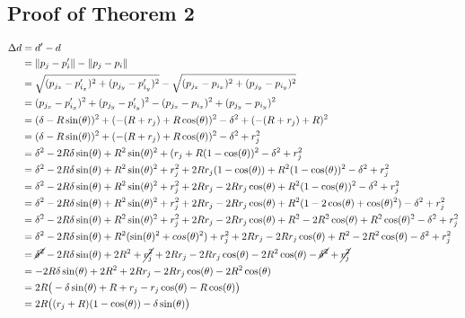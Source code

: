 \documentclass[conference]{IEEEtran}
\begin{document}
\subsection{Proof of Theorem 2} \label{thm:2}

    \begin{align*}
      \Delta d &= d' - d \\
      &= \lVert p_j - p'_i \rVert - \lVert p_j - p_i \rVert \\
      &=\sqrt{(p_{j_x} - p'_{i_x})^2 + (p_{j_y} - p'_{i_y})^2} - \sqrt{(p_{j_x} - p_{i_x})^2 + (p_{j_y} - p_{i_y})^2} \\
      &=(p_{j_x} - p'_{i_x})^2 + (p_{j_y} - p'_{i_y})^2 - (p_{j_x} - p_{i_x})^2 + (p_{j_y} - p_{i_y})^2 \\
      &= (\delta - R\sin(\theta))^2 + (-(R+r_j) + R\cos(\theta))^2 - \delta^2 + (-(R+r_j) + R)^2 \\
      &= (\delta - R\sin(\theta))^2 + (-(R+r_j) + R\cos(\theta))^2 - \delta^2 + r_j^2 \\
      &= \delta^2 - 2R\delta\sin(\theta) + R^2\sin(\theta)^2 + (r_j + R(1 - \cos(\theta))^2 - \delta^2 + r_j^2 \\
      &= \delta^2 - 2R\delta\sin(\theta) + R^2\sin(\theta)^2 + r_j^2 + 2Rr_j(1 - \cos(\theta)) + R^2(1 - \cos(\theta))^2 - \delta^2 + r_j^2 \\
      &= \delta^2 - 2R\delta\sin(\theta) + R^2\sin(\theta)^2 + r_j^2 + 2Rr_j - 2Rr_j\cos(\theta) + R^2(1 - \cos(\theta))^2 - \delta^2 + r_j^2 \\
      &= \delta^2 - 2R\delta\sin(\theta) + R^2\sin(\theta)^2 + r_j^2 + 2Rr_j - 2Rr_j\cos(\theta) + R^2(1 - 2\cos(\theta) + \cos(\theta)^2) - \delta^2 + r_j^2 \\
      &= \delta^2 - 2R\delta\sin(\theta) + R^2\sin(\theta)^2 + r_j^2 + 2Rr_j - 2Rr_j\cos(\theta) + R^2 - 2R^2\cos(\theta) + R^2\cos(\theta)^2 - \delta^2 + r_j^2 \\
      &= \delta^2 - 2R\delta\sin(\theta) + R^2(\sin(\theta)^2 + cos(\theta)^2) + r_j^2 + 2Rr_j - 2Rr_j\cos(\theta) + R^2 - 2R^2\cos(\theta) - \delta^2 + r_j^2 \\
      &= \cancel{\delta^2} - 2R\delta\sin(\theta) + 2R^2 + \cancel{r_j^2} + 2Rr_j - 2Rr_j\cos(\theta) - 2R^2\cos(\theta) - \cancel{\delta^2} + \cancel{r_j^2} \\
      &= -2R\delta\sin(\theta) + 2R^2 + 2Rr_j - 2Rr_j\cos(\theta) - 2R^2\cos(\theta) \\
      &= 2R\big(-\delta\sin(\theta) + R + r_j - r_j\cos(\theta) - R\cos(\theta)\big) \\
      &= 2R\big((r_j + R)(1 - \cos(\theta))-\delta\sin(\theta)\big) \\
    \end{align*}
\end{document}
